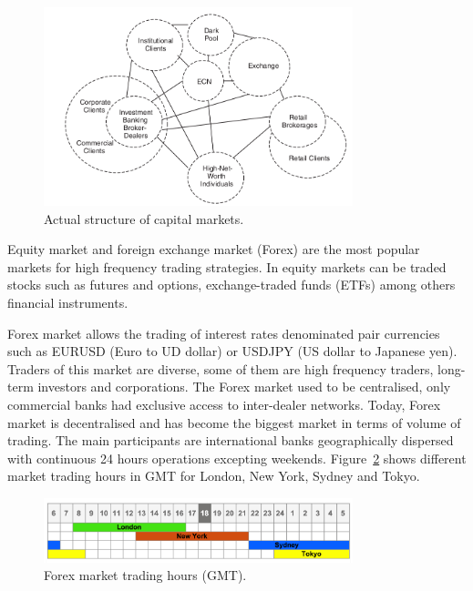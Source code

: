 \begin{figure}[!h]
  \centering
  \includegraphics[width=0.8\textwidth]{img/capitalmarketsnow}
  \caption{Actual structure of capital markets.}
  \label{fig:capitalmarketnow}
\end{figure}
Equity market and foreign exchange market (Forex) are the most popular markets
for high frequency trading strategies. In equity markets can be traded stocks
such as futures and options, exchange-traded funds (ETFs) among others financial
instruments.

Forex market allows the trading of interest rates denominated pair currencies
such as EURUSD (Euro to UD dollar) or USDJPY (US dollar to Japanese yen). Traders of this market are diverse, some of them are
high frequency traders, long-term investors and corporations. The Forex market
used to be centralised, only commercial banks had exclusive access to
inter-dealer networks. Today, Forex market is decentralised and has become the
biggest market in terms of volume of trading. The main participants are
international banks geographically dispersed with continuous 24 hours operations
excepting weekends. Figure~\ref{fig:Forextimes} shows different market trading
hours in GMT for London, New York, Sydney and Tokyo.

\begin{figure}[!h]
  \centering
  \includegraphics[width=0.8\textwidth]{img/forex-trading-hours}
  \caption{Forex market trading hours (GMT).}
  \label{fig:Forextimes}
\end{figure}

